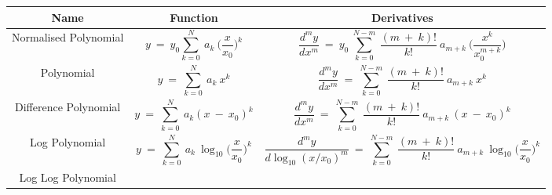 \begin{landscape}
\begin{table}
    \centering
    \begin{tabular}{ccc}
        \hline
          Name & Function & Derivatives \\
         \hline
         Normalised Polynomial 
         & \parbox{6cm}{\begin{equation}
             y~=~y_0\sum_{k=0}^{N}~a_{k}~\bigg(\frac{x}{x_0}\bigg)^k
             \label{eq:norm_poly}
         \end{equation}}
         & \parbox{8cm}{\begin{equation*}
            \frac{d^my}{dx^m}~=~y_0~\sum_{k=0}^{N-m}~\frac{(m~+~k)!}{k!}~a_{m+k}~\bigg(\frac{x^k}{x_0^{m+k}}\bigg)
        \end{equation*}} \\
         Polynomial 
         & \parbox{6cm}{\begin{equation}
            y~=~\sum_{k=0}^{N}~a_{k}~x^k \label{eq:additional_basis_a}
         \end{equation}}
         & \parbox{8cm}{\begin{equation*}
            \frac{d^my}{dx^m}~=~\sum_{k=0}^{N-m}~\frac{(m~+~k)!}{k!}~a_{m+k}~x^k
         \end{equation*}} \\
         Difference Polynomial 
         & \parbox{6cm}{\begin{equation}
            y~=~\sum_{k=0}^{N}~a_{k} (x~-~x_0)^k
            \label{eq:additional_basis_b}
         \end{equation}}
         & \parbox{8cm}{\begin{equation*}
            \frac{d^my}{dx^m}~=~\sum_{k=0}^{N-m}~\frac{(m~+~k)!}{k!}~a_{m+k}~(x~-~x_0)^k
         \end{equation*}}\\
         Log Polynomial 
         &  \parbox{6cm}{\begin{equation}
            y~=~\sum_{k=0}^{N}~a_{k}~\log_{10}\bigg(\frac{x}{x_0}\bigg)^k 
            \label{eq:log_poly}
         \end{equation}}
         &  \parbox{8cm}{\begin{equation*}
            \frac{d^my}{d\log_{10}(x/x_0)^m}~=~\sum_{k=0}^{N-m}~\frac{(m~+~k)!}{k!}~a_{m+k}~\log_{10}\bigg(\frac{x}{x_0}\bigg)^k
         \end{equation*}} \\
         Log Log Polynomial 
         & \parbox{6cm}{\begin{equation}

\end{equation}}
\end{tabular}
\end{table}
\end{landscape}
